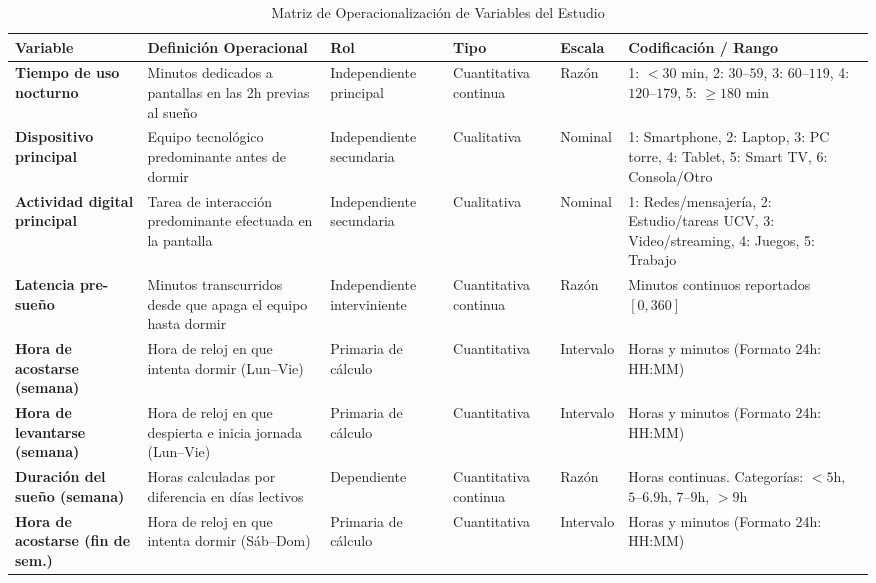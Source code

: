 \documentclass[12pt, letterpaper]{article}
\begin{document}
\begin{table}[H]
    \centering
    \caption{Matriz de Operacionalización de Variables del Estudio}
    \label{tab:operacionalizacion}
    \vspace{0.2cm}
    \scriptsize
    \begin{tabularx}{\textwidth}{p{2.8cm}p{3.8cm}lllX}
        \toprule
        \textbf{Variable} & \textbf{Definición Operacional} & \textbf{Rol} & \textbf{Tipo} & \textbf{Escala} & \textbf{Codificación / Rango} \\
        \midrule
        \textbf{Tiempo de uso nocturno} & Minutos dedicados a pantallas en las 2h previas al sueño & Independiente principal & Cuantitativa continua & Razón & 1: $<30$ min, 2: $30\text{--}59$, 3: $60\text{--}119$, 4: $120\text{--}179$, 5: $\ge 180$ min \\
        \addlinespace
        \textbf{Dispositivo principal} & Equipo tecnológico predominante antes de dormir & Independiente secundaria & Cualitativa & Nominal & 1: Smartphone, 2: Laptop, 3: PC torre, 4: Tablet, 5: Smart TV, 6: Consola/Otro \\
        \addlinespace
        \textbf{Actividad digital principal} & Tarea de interacción predominante efectuada en la pantalla & Independiente secundaria & Cualitativa & Nominal & 1: Redes/mensajería, 2: Estudio/tareas UCV, 3: Video/streaming, 4: Juegos, 5: Trabajo \\
        \addlinespace
        \textbf{Latencia pre-sueño} & Minutos transcurridos desde que apaga el equipo hasta dormir & Independiente interviniente & Cuantitativa continua & Razón & Minutos continuos reportados $[0, 360]$ \\
        \addlinespace
        \textbf{Hora de acostarse (semana)} & Hora de reloj en que intenta dormir (Lun--Vie) & Primaria de cálculo & Cuantitativa & Intervalo & Horas y minutos (Formato 24h: HH:MM) \\
        \addlinespace
        \textbf{Hora de levantarse (semana)} & Hora de reloj en que despierta e inicia jornada (Lun--Vie) & Primaria de cálculo & Cuantitativa & Intervalo & Horas y minutos (Formato 24h: HH:MM) \\
        \addlinespace
        \textbf{Duración del sueño (semana)} & Horas calculadas por diferencia en días lectivos & Dependiente & Cuantitativa continua & Razón & Horas continuas. Categorías: $<5$h, $5\text{--}6.9$h, $7\text{--}9$h, $>9$h \\
        \addlinespace
        \textbf{Hora de acostarse (fin de sem.)} & Hora de reloj en que intenta dormir (Sáb--Dom) & Primaria de cálculo & Cuantitativa & Intervalo & Horas y minutos (Formato 24h: HH:MM) \\

\end{tabularx}
\end{table}
\end{document}
